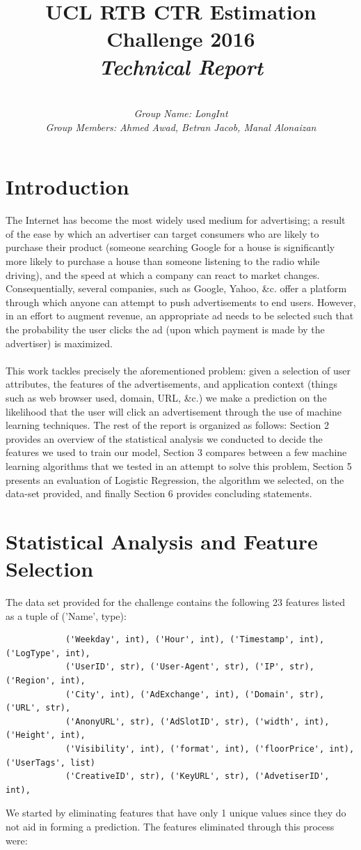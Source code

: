 \documentclass{article}
\title{UCL RTB CTR Estimation Challenge 2016 \\ \textit{Technical Report}}
\author{\vspace{-2em}\\\textit{Group Name: LongInt} \\ \textit{Group Members: Ahmed Awad, Betran Jacob, Manal Alonaizan}}
\begin{document}
	\maketitle
	\section{Introduction}
		The Internet has become the most widely used medium for advertising; a result of the ease by which 
		an advertiser can target consumers who are likely to purchase their product (someone searching Google for a house is significantly
		more likely to purchase a house than someone listening to the radio while driving), and the speed at which a company can react
		to market changes. Consequentially, several companies, such as Google, Yahoo, \&c. offer a platform through which anyone can 
		attempt to push advertisements to end users. However, in an effort to augment revenue, an appropriate ad needs to be selected
		such that the probability the user clicks the ad (upon which payment is made by the advertiser) is maximized.
		\paragraph*{}
		This work tackles precisely the aforementioned problem: given a selection of user attributes, the features of the advertisements, and application context 
		(things such as web browser used, domain, URL, \&c.) we make a prediction on the likelihood that the user will click an advertisement through the use 
		of machine learning techniques. The rest of the report is organized as follows: Section 2 provides an overview of the statistical analysis we conducted
		to decide the features we used to train our model, Section 3 compares between a few machine learning algorithms that we tested in an attempt to solve this problem,
		Section 5 presents an evaluation of Logistic Regression, the algorithm we selected, on the data-set provided, and finally Section 6 provides concluding statements.
	\section{Statistical Analysis and Feature Selection}
		The data set provided for the challenge contains the following 23 features listed as a tuple of ('Name', type):
		\\
		\begin{verbatim}
			('Weekday', int), ('Hour', int), ('Timestamp', int), ('LogType', int), 
			('UserID', str), ('User-Agent', str), ('IP', str), ('Region', int), 
			('City', int), ('AdExchange', int), ('Domain', str), ('URL', str), 
			('AnonyURL', str), ('AdSlotID', str), ('width', int), ('Height', int), 
			('Visibility', int), ('format', int), ('floorPrice', int), ('UserTags', list)
			('CreativeID', str), ('KeyURL', str), ('AdvetiserID', int), 
		\end{verbatim}
		We started by eliminating features that have only 1 unique values since they do not aid in forming a prediction. The features 
		eliminated through this process were:
		
\end{document}
